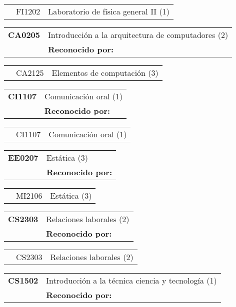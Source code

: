 \documentclass[letterpaper]{article}%
\begin{document}
\begin{tabularx}{\textwidth}{p{1.5cm}p{1.5cm}p{10cm}}%
&FI1202&Laboratorio de física general II (1)\\%
\end{tabularx}%
\begin{tabularx}{\textwidth}{p{1.5cm}p{10cm}}%
\textbf{CA0205}&Introducción a la arquitectura de computadores (2)\\%
&\textbf{Reconocido por: }\\%
\end{tabularx}%
\begin{tabularx}{\textwidth}{p{1.5cm}p{1.5cm}p{10cm}}%
&CA2125&Elementos de computación (3)\\%
\end{tabularx}%
\begin{tabularx}{\textwidth}{p{1.5cm}p{10cm}}%
\textbf{CI1107}&Comunicación oral (1)\\%
&\textbf{Reconocido por: }\\%
\end{tabularx}%
\begin{tabularx}{\textwidth}{p{1.5cm}p{1.5cm}p{10cm}}%
&CI1107&Comunicación oral (1)\\%
\end{tabularx}%
\begin{tabularx}{\textwidth}{p{1.5cm}p{10cm}}%
\textbf{EE0207}&Estática (3)\\%
&\textbf{Reconocido por: }\\%
\end{tabularx}%
\begin{tabularx}{\textwidth}{p{1.5cm}p{1.5cm}p{10cm}}%
&MI2106&Estática (3)\\%
\end{tabularx}%
\begin{tabularx}{\textwidth}{p{1.5cm}p{10cm}}%
\textbf{CS2303}&Relaciones laborales (2)\\%
&\textbf{Reconocido por: }\\%
\end{tabularx}%
\begin{tabularx}{\textwidth}{p{1.5cm}p{1.5cm}p{10cm}}%
&CS2303&Relaciones laborales (2)\\%
\end{tabularx}%
\begin{tabularx}{\textwidth}{p{1.5cm}p{10cm}}%
\textbf{CS1502}&Introducción a la técnica ciencia y tecnología (1)\\%
&\textbf{Reconocido por: }\\%
\end{tabularx}%
\end{document}
